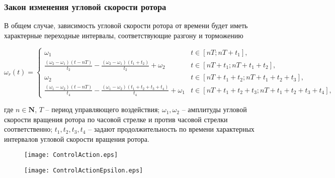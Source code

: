 \begin{frame}
\frametitle{Закон изменения угловой скорости ротора}

	В общем случае, зависимость угловой скорости ротора от времени будет иметь характерные переходные интервалы, соответствующие разгону и торможению 
	
		\scriptsize 
		\vspace{-4mm}
		\begin{equation*}
		\omega_r(t) =
		\begin{cases}
		
		\omega_1 & t \in \left[ nT;  nT + t_1 \right] ,\\
		
		\frac{(\omega_2 - \omega_1)(t-nT)}{t_2} - \frac{(\omega_2 - \omega_1)(t_1+t_2)}{t_2} + \omega_2 & t \in \left[ nT + t_1;  nT + t_1+t_2 \right], \\
		
		\omega_2 & t \in \left[ nT + t_1+t_2;  nT + t_1+t_2+t_3 \right] ,\\
		
		\frac{(\omega_1 - \omega_2)(t-nT)}{t_4} - \frac{(\omega_1 - \omega_2)(t_1+t_2+t_3+t_4)}{t_4} + \omega_1 &t \in \left[ nT + t_1 + t_2+t_3;  nT + t_1+t_2+t_3+t_4 \right] ,
		
		\end{cases}
		\label{omegaRotorGeneral}
		\end{equation*}
		
		\small
		где $n \in \mathbf{N}$, $T$ -- период управляющего воздействия; $ \omega_1, \omega_2 $ -- амплитуды угловой скорости вращения ротора по часовой стрелке и против часовой стрелки соответственно; $t_1, t_2, t_3, t_4$ -- задают продолжительность по времени характерных интервалов угловой скорости вращения ротора. 
		
		
		
		\begin{minipage}[t]{0.47\linewidth}
			\begin{figure}[!ht]
				\centering
				\texttt{[image: ControlAction.eps]}
			\end{figure}
			
		\end{minipage}	
		\hfill
		\begin{minipage}[t]{0.47\linewidth}
			\begin{figure}[!ht]
				\centering
				\texttt{[image: ControlActionEpsilon.eps]}
			\end{figure}
		\end{minipage}	
	
	
\end{frame}


